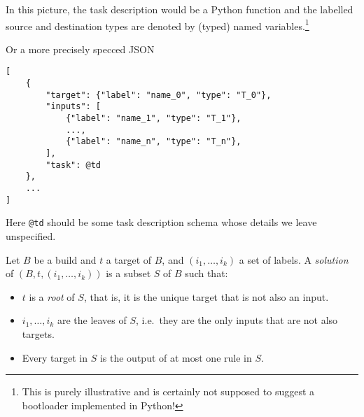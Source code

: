 In this picture, the task description would be a Python function and the labelled source and destination types are denoted by (typed) named variables.\footnote{This is purely illustrative and is certainly not supposed to
suggest a bootloader implemented in Python!}

Or a more precisely specced JSON

\begin{comment}
\begin{Shaded}
\begin{Highlighting}[]
\OtherTok{[}
    \FunctionTok{\{}
        \DataTypeTok{"target"}\FunctionTok{:} \FunctionTok{\{}\DataTypeTok{"label"}\FunctionTok{:} \StringTok{"name\_0"}\FunctionTok{,} \DataTypeTok{"type"}\FunctionTok{:} \StringTok{"T\_0"}\FunctionTok{\},}
        \DataTypeTok{"inputs"}\FunctionTok{:} \OtherTok{[}
            \FunctionTok{\{}\DataTypeTok{"label"}\FunctionTok{:} \StringTok{"name\_1"}\FunctionTok{,} \DataTypeTok{"type"}\FunctionTok{:} \StringTok{"T\_1"}\FunctionTok{\}}\OtherTok{,}
            \ErrorTok{...}\OtherTok{,}
            \FunctionTok{\{}\DataTypeTok{"label"}\FunctionTok{:} \StringTok{"name\_n"}\FunctionTok{,} \DataTypeTok{"type"}\FunctionTok{:} \StringTok{"T\_n"}\FunctionTok{\}}\OtherTok{,}
        \OtherTok{]}\FunctionTok{,}
        \DataTypeTok{"task"}\FunctionTok{:} \ErrorTok{@td}
    \FunctionTok{\}}\OtherTok{,}
    \ErrorTok{...}
\OtherTok{]}
\end{Highlighting}
\end{Shaded}
\end{comment}

\begin{lstlisting}
[
    {
        "target": {"label": "name_0", "type": "T_0"},
        "inputs": [
            {"label": "name_1", "type": "T_1"},
            ...,
            {"label": "name_n", "type": "T_n"},
        ],
        "task": @td
    },
    ...
]
\end{lstlisting}

Here \texttt{@td} should be some task description schema whose details we leave unspecified.

\begin{definition}
  Let \(B\) be a build and \(t\) a target of \(B\), and \((i_1,\ldots,i_k)\) a set of labels. 
  A \emph{solution} of \((B,t,(i_1,\ldots,i_k))\) is a subset \(S\) of \(B\) such that:

  \begin{itemize}
  \item
    \(t\) is a \emph{root} of \(S\), that is, it is the unique target that is not also an input.
  \item
    \(i_1,\ldots,i_k\) are the leaves of \(S\), i.e.~they are the only inputs that are not also targets.
  \item
    Every target in \(S\) is the output of at most one rule in \(S\).
  \end{itemize}

\end{definition}

